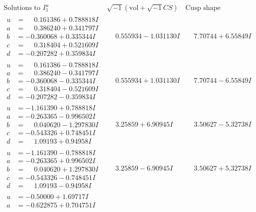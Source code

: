 \documentclass[1p]{elsarticle_modified}
\theoremstyle{definition}
\newcommand{\I}{\sqrt{-1}}
\begin{document}
$$\begin{array}{c|c|c}  
\text{Solutions to }I^u_{1}& \I (\text{vol} + \sqrt{-1}CS) & \text{Cusp shape}\\
 \hline 
\begin{aligned}
u &= \phantom{-}0.161386 + 0.788818 I \\
a &= \phantom{-}0.386240 + 0.341797 I \\
b &= -0.360068 + 0.335344 I \\
c &= \phantom{-}0.318404 + 0.521609 I \\
d &= -0.207282 + 0.359834 I\end{aligned}
 & \phantom{-}0.555934 - 1.031130 I & \phantom{-}7.70744 + 6.55849 I \\ \hline\begin{aligned}
u &= \phantom{-}0.161386 - 0.788818 I \\
a &= \phantom{-}0.386240 - 0.341797 I \\
b &= -0.360068 - 0.335344 I \\
c &= \phantom{-}0.318404 - 0.521609 I \\
d &= -0.207282 - 0.359834 I\end{aligned}
 & \phantom{-}0.555934 + 1.031130 I & \phantom{-}7.70744 - 6.55849 I \\ \hline\begin{aligned}
u &= -1.161390 + 0.788818 I \\
a &= -0.263365 - 0.996502 I \\
b &= \phantom{-}0.040620 - 1.297830 I \\
c &= -0.543326 + 0.748451 I \\
d &= \phantom{-}1.09193 + 0.94958 I\end{aligned}
 & \phantom{-}3.25859 + 6.90945 I & \phantom{-}3.50627 - 5.32738 I \\ \hline\begin{aligned}
u &= -1.161390 - 0.788818 I \\
a &= -0.263365 + 0.996502 I \\
b &= \phantom{-}0.040620 + 1.297830 I \\
c &= -0.543326 - 0.748451 I \\
d &= \phantom{-}1.09193 - 0.94958 I\end{aligned}
 & \phantom{-}3.25859 - 6.90945 I & \phantom{-}3.50627 + 5.32738 I \\ \hline\begin{aligned}
u &= -0.50000 + 1.69717 I \\
a &= -0.622875 + 0.704751 I \\

\end{aligned}
\end{array}$$
\end{document}
